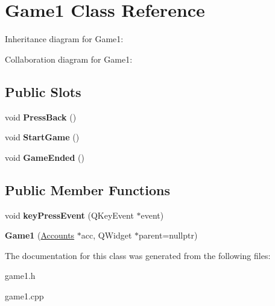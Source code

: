 \hypertarget{classGame1}{}\section{Game1 Class Reference}
\label{classGame1}


Inheritance diagram for Game1\+:


Collaboration diagram for Game1\+:
\subsection*{Public Slots}
\begin{DoxyCompactItemize}
\item 
\mbox{\label{classGame1_aa236d689febb1eac426293350c991eb2}} 
void {\bfseries Press\+Back} ()
\item 
\mbox{\label{classGame1_aaba43ec7b8b814a74dd701e4502c40bb}} 
void {\bfseries Start\+Game} ()
\item 
\mbox{\label{classGame1_acdc8a02eea6d4e76d60b655b30dd601f}} 
void {\bfseries Game\+Ended} ()
\end{DoxyCompactItemize}
\subsection*{Public Member Functions}
\begin{DoxyCompactItemize}
\item 
\mbox{\label{classGame1_a1c1667a4c41a139217da796ca0f47fa6}} 
void {\bfseries key\+Press\+Event} (Q\+Key\+Event $\ast$event)
\item 
\mbox{\label{classGame1_a410b8810ee98414bbf08eb855a356e7d}} 
{\bfseries Game1} (\hyperlink{classAccounts}{Accounts} $\ast$acc, Q\+Widget $\ast$parent=nullptr)
\end{DoxyCompactItemize}


The documentation for this class was generated from the following files\+:\begin{DoxyCompactItemize}
\item 
game1.\+h\item 
game1.\+cpp\end{DoxyCompactItemize}
